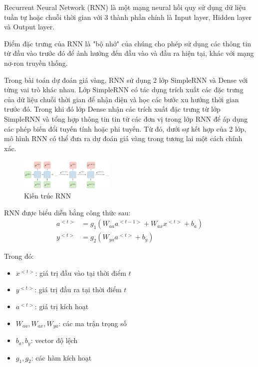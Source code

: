 Recurrent Neural Network (RNN) là một mạng neural hồi quy sử dụng dữ liệu tuần tự hoặc chuỗi thời gian với 3 thành phần chính là Input layer, Hidden layer và Output layer\cite{website2}.

Điểm đặc trưng của RNN là "bộ nhớ" của chúng cho phép sử dụng các thông tin từ đầu vào trước đó để ảnh hưởng đến đầu vào và đầu ra hiện tại, khác với mạng nơ-ron truyền thống.

Trong bài toán dự đoán giá vàng, RNN sử dụng 2 lớp SimpleRNN và Dense với từng vai trò khác nhau. Lớp SimpleRNN có tác dụng trích xuất các đặc trưng của dữ liệu chuỗi thời gian để nhận diện và học các bước xu hướng thời gian trước đó. Trong khi đó lớp Dense nhận các trích xuất đặc trưng từ lớp SimpleRNN và tổng hợp thông tin tin từ các đơn vị trong lớp RNN để áp dụng các phép biến đổi tuyến tính hoặc phi tuyến. Từ đó, dưới sự kết hợp của 2 lớp, mô hình RNN có thể đưa ra dự đoán giá vàng trong tương lai một cách chính xác.
\begin{figure}[htbp]
\centerline{\includegraphics[width=0.4\textwidth]{img/RNN.png}}
\caption{Kiến trúc RNN}
\label{fig}
\end{figure}

RNN được biểu diễn bằng công thức sau:
\begin{align}
    a^{<t>} &= g_1(W_{aa}a^{<t-1>} + W_{ax}x^{<t>} + b_a) \\
    y^{<t>} &= g_2(W_{ya}a^{<t>} + b_y)
\end{align}

Trong đó:
\begin{itemize}
    \item $x^{<t>}$: giá trị đầu vào tại thời điểm $t$
    \item $y^{<t>}$: giá trị đầu ra tại thời điểm $t$
    \item $a^{<t>}$: giá trị kích hoạt
    \item $W_{aa}, W_{ax}, W_{ya}$: các ma trận trọng số
    \item $b_a, b_y$: vector độ lệch
    \item $g_1, g_2$: các hàm kích hoạt
\end{itemize}